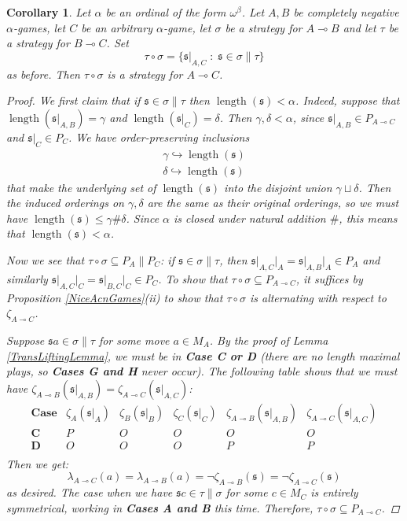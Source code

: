 \documentclass[11pt]{article} %
\theoremstyle{plain} %
\newtheorem{corollary}[theorem]{Corollary}
\theoremstyle{definition} %
\theoremstyle{note}
\theoremstyle{exercisestyle}
\renewcommand{\implies}{\multimap}
\newcommand{\comp}[2]{#1 \circ #2}
\newcommand{\suchthat}{\;\colon\;}
\newcommand{\s}{\mathfrak s}
\DeclareMathOperator{\length}{length}
\renewcommand{\subset}{\subseteq}
\begin{document}
\begin{corollary}
  Let $\alpha$ be an ordinal of the form $\omega^{\beta}$.  Let $A,B$ be completely negative $\alpha$-games, let $C$ be an arbitrary $\alpha$-game, let $\sigma$ be a strategy for $A\implies B$ and let $\tau$ be a strategy for $B\implies C$.  Set
  \[
    \comp\tau\sigma = \{\s\vert_{A,C}\suchthat\s\in\sigma\|\tau\}
    \]
  as before.  Then $\comp\tau\sigma$ is a strategy for $A\implies C$.

  \begin{proof}
    We first claim that if $\s\in\sigma\|\tau$ then $\length(\s)<\alpha$.  Indeed, suppose that $\length(\s\vert_{A,B})=\gamma$ and $\length(\s\vert_C)=\delta$.  Then $\gamma,\delta<\alpha$, since $\s\vert_{A,B}\in P_{A\implies C}$ and $\s\vert_C\in P_C$.  We have order-preserving inclusions
    \begin{gather*}
      \gamma\hookrightarrow\length(\s)\\
      \delta\hookrightarrow\length(\s)
    \end{gather*}
    that make the underlying set of $\length(\s)$ into the disjoint union $\gamma\sqcup\delta$.  Then the induced orderings on $\gamma,\delta$ are the same as their original orderings, so we must have $\length(\s)\le\gamma\#\delta$.  Since $\alpha$ is closed under natural addition $\#$, this means that $\length(\s)<\alpha$.  

    Now we see that $\comp\tau\sigma\subset P_A\|P_C$: if $\s\in\sigma\|\tau$, then $\s\vert_{A,C}\vert_A=\s\vert_{A,B}\vert_A\in P_A$ and similarly $\s\vert_{A,C}\vert_C=\s\vert_{B,C}\vert_C\in P_C$.  To show that $\comp\tau\sigma\subset P_{A\implies C}$, it suffices by Proposition \ref{NiceAcnGames}(ii) to show that $\comp\tau\sigma$ is alternating with respect to $\zeta_{A\implies C}$.

    Suppose $\s a\in\sigma\|\tau$ for some move $a\in M_A$.  By the proof of Lemma \ref{TransLiftingLemma}, we must be in \textbf{Case C or D} (there are no length maximal plays, so \textbf{Cases G and H} never occur).  The following table shows that we must have $\zeta_{A\implies B}(\s\vert_{A,B})=\zeta_{A\implies C}(\s\vert_{A,C})$:
    \[
      \begin{array}{c|ccc|cc}
        \textbf{Case} & \zeta_A(\s\vert_A) & \zeta_B(\s\vert_B) & \zeta_C(\s\vert_C) & \zeta_{A\implies B}(\s\vert_{A,B}) & \zeta_{A\implies C}(\s\vert_{A,C}) \\
        \hline
        \textbf{C} & P & O & O & O & O \\
        \textbf{D} & O & O & O & P & P \\
      \end{array}
      \]
    Then we get:
    \[
      \lambda_{A\implies C}(a) = \lambda_{A\implies B}(a) = \neg\zeta_{A\implies B}(\s) = \neg\zeta_{A\implies C}(\s)
      \]
    as desired.  The case when we have $\s c\in\tau\|\sigma$ for some $c\in M_C$ is entirely symmetrical, working in \textbf{Cases A and B} this time.  Therefore, $\comp\tau\sigma\subset P_{A\implies C}$.  


\end{proof}
\end{corollary}
\end{document}
